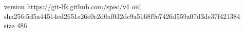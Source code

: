 version https://git-lfs.github.com/spec/v1
oid sha256:5d5a44514cd2651e26e0c2d0af032dc9a5168f9e7426d559a07d3de37f421384
size 486
